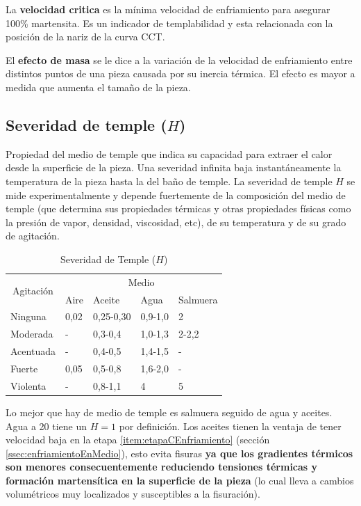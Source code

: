 La \textbf{velocidad critica} es la mínima velocidad de enfriamiento para asegurar 100\% martensita. Es un indicador de templabilidad y esta relacionada con la posición de la nariz de la curva CCT.

El \textbf{efecto de masa} se le dice a la variación de la velocidad de enfriamiento entre distintos puntos de una pieza causada por su inercia térmica. El efecto es mayor a medida que aumenta el tamaño de la pieza.

\subsection[Severidad de temple]{Severidad de temple ($H$)}
Propiedad del medio de temple que indica su capacidad para extraer el calor desde la superficie de la pieza. Una severidad infinita baja instantáneamente la temperatura de la pieza hasta la del baño de temple. La severidad de temple $H$ se mide experimentalmente y depende fuertemente de la composición del medio de temple (que determina sus propiedades térmicas y otras propiedades físicas como la presión de vapor, densidad, viscosidad, etc), de su temperatura y de su grado de agitación. 


\begin{table}[htb!]
\centering
\begin{tabular}{l|l|l|l|l}
\hline
\multicolumn{1}{c|}{\multirow{2}{*}{Agitación}} & \multicolumn{4}{c}{Medio}            \\ \cline{2-5} 
\multicolumn{1}{c|}{}                           & Aire & Aceite    & Agua    & Salmuera \\ \hline
Ninguna                                         & 0,02 & 0,25-0,30 & 0,9-1,0 & 2        \\
Moderada                                        & -    & 0,3-0,4   & 1,0-1,3 & 2-2,2    \\
Acentuada                                       & -    & 0,4-0,5   & 1,4-1,5 & -        \\
Fuerte                                          & 0,05 & 0,5-0,8   & 1,6-2,0 & -        \\
Violenta                                        & -    & 0,8-1,1   & 4       & 5        \\ \hline
\end{tabular}
\caption{Severidad de Temple ($H$)}
\label{tab:severidadTemple}
\end{table}

Lo mejor que hay de medio de temple es salmuera seguido de agua y aceites. Agua a 20 \grad{} tiene un $H=1$ por definición. Los aceites tienen la ventaja de tener velocidad baja en la etapa \ref{item:etapaCEnfriamiento} (secci\'on \ref{ssec:enfriamientoEnMedio}), esto evita fisuras \textbf{ya que los gradientes térmicos son menores consecuentemente reduciendo tensiones térmicas y formación martensítica en la superficie de la pieza} (lo cual lleva a cambios volumétricos muy localizados y susceptibles a la fisuración).


